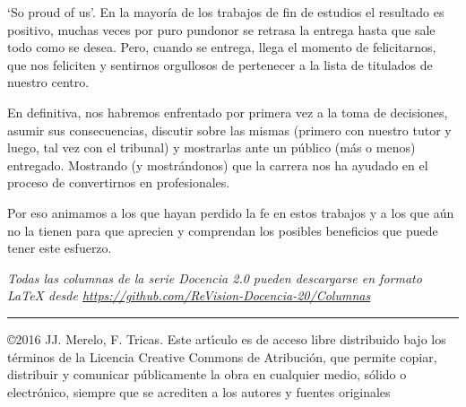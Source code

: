 \documentclass[twoside,10pt]{article}
\newcommand{\surl}[1]{{\small\url{#1}}}
\begin{document}
\begin{multicols}{2}
`So proud of us'. En la mayor\'ia de los trabajos de fin de
  estudios el resultado es positivo, muchas veces por puro pundonor se
  retrasa la entrega hasta que sale todo como se desea. Pero, cuando
  se entrega, llega el momento de felicitarnos,
  que nos feliciten y sentirnos orgullosos de pertenecer a la lista de
  titulados de nuestro centro.


En definitiva, nos habremos enfrentado por primera vez a la toma de decisiones, asumir sus consecuencias, discutir sobre las mismas (primero con nuestro tutor y luego, tal vez con el tribunal) y mostrarlas ante un p\'ublico (m\'as o menos) entregado. Mostrando (y mostr\'andonos) que la carrera nos ha ayudado en el proceso de convertirnos en profesionales.

Por eso animamos a los que hayan perdido la fe en estos trabajos y a los que a\'un no la tienen para que aprecien y comprendan los posibles beneficios que puede tener este esfuerzo.
\bigskip

\noindent\emph{Todas las columnas de la serie Docencia 2.0
pueden descargarse en formato LaTeX desde
\surl{https://github.com/ReVision-Docencia-20/Columnas}}

\noindent\rule{90mm}{1pt}

{\small \noindent\copyright 2016 JJ. Merelo, F. Tricas. Este art\'{\i}culo es de acceso libre distribuido bajo los t\'erminos
de la Licencia Creative Commons de Atribuci\'on, que permite copiar,
distribuir y comunicar p\'ublicamente la obra en cualquier medio, s\'olido
o electr\'onico, siempre que se acrediten a los autores y fuentes
originales}

\end{multicols}
\end{document}
